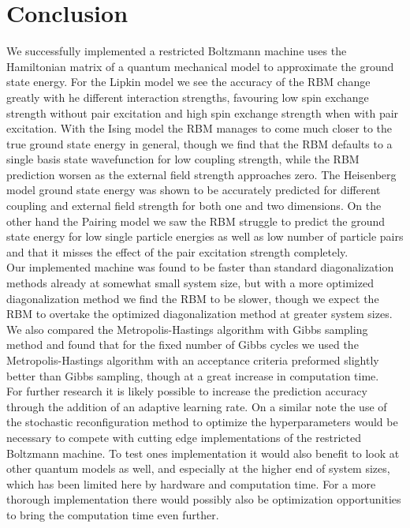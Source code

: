 \chapter{Conclusion}

We successfully implemented a restricted Boltzmann machine uses the Hamiltonian matrix of a quantum mechanical model to approximate the ground state energy. For the Lipkin model we see the accuracy of the RBM change greatly with he different interaction strengths, favouring low spin exchange strength without pair excitation and high spin exchange strength when with pair excitation. With the Ising model the RBM manages to come much closer to the true ground state energy in general, though we find that the RBM defaults to a single basis state wavefunction for low coupling strength, while the RBM prediction worsen as the external field strength approaches zero. The Heisenberg model ground state energy was shown to be accurately predicted for different coupling and external field strength for both one and two dimensions. On the other hand the Pairing model we saw the RBM struggle to predict the ground state energy for low single particle energies as well as low number of particle pairs and that it misses the effect of the pair excitation strength completely.
\vspace{\baselineskip}\\
Our implemented machine was found to be faster than standard diagonalization methods already at somewhat small system size, but with a more optimized diagonalization method we find the RBM to be slower, though we expect the RBM to overtake the optimized diagonalization method at greater system sizes.
\vspace{\baselineskip}\\
We also compared the Metropolis-Hastings algorithm with Gibbs sampling method and found that for the fixed number of Gibbs cycles we used the Metropolis-Hastings algorithm with an acceptance criteria preformed slightly better than Gibbs sampling, though at a great increase in computation time.
\vspace{\baselineskip}\\
For further research it is likely possible to increase the prediction accuracy through the addition of an adaptive learning rate. On a similar note the use of the stochastic reconfiguration method to optimize the hyperparameters would be necessary to compete with cutting edge implementations of the restricted Boltzmann machine. To test ones implementation it would also benefit to look at other quantum models as well, and especially at the higher end of system sizes, which has been limited here by hardware and computation time. For a more thorough implementation there would possibly also be optimization opportunities to bring the computation time even further.
